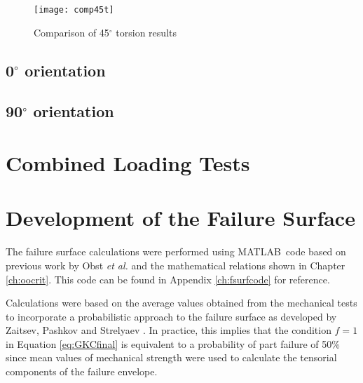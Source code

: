 \documentclass[main.tex]{subfiles}
\begin{document}
\begin{figure}[h]
	\center
	\texttt{[image: comp45t]}
	\caption{Comparison of 45$^\circ$ torsion results} \label{fig:45comp}
\end{figure}
  
\subsection{0$^\circ$ orientation} \label{ssec:0r}
\subsection{90$^\circ$ orientation} \label{ssec:90r}
\section{Combined Loading Tests} \label{sec:clr}
\section{Development of the Failure Surface} \label{sec:fsc}

The failure surface calculations were performed using MATLAB\textregistered~code based on previous work by Obst \emph{et al.} \cite{Obst2018} and the mathematical relations shown in Chapter \ref{ch:oocrit}. This code can be found in Appendix \ref{ch:fsurfcode} for reference.

Calculations were based on the average values obtained from the mechanical tests to incorporate a probabilistic approach to the failure surface as developed by Zaitsev, Pashkov and Strelyaev \cite{Zaitsev1975}. In practice, this implies that the condition $f=1$ in Equation \ref{eq:GKCfinal} is equivalent to a probability of part failure of 50\% since mean values of mechanical strength were used to calculate the tensorial components of the failure envelope.  

% 

\end{document}
